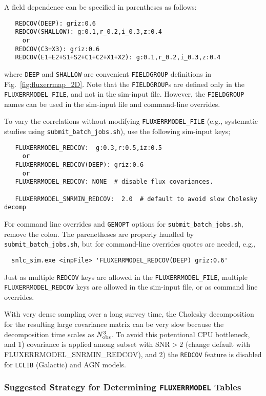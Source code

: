 \documentclass[12pt]{article}
\newcommand{\submit}{\tt submit\_batch\_jobs.sh}
\begin{document}
{A field dependence can be specified in parentheses as follows:
\begin{Verbatim}
   REDCOV(DEEP): griz:0.6
   REDCOV(SHALLOW): g:0.1,r_0.2,i_0.3,z:0.4
     or
   REDCOV(C3+X3): griz:0.6
   REDCOV(E1+E2+S1+S2+C1+C2+X1+X2): g:0.1,r_0.2,i_0.3,z:0.4
\end{Verbatim}
%
where {\tt DEEP} and {\tt SHALLOW} are convenient 
{\tt FIELDGROUP} definitions in Fig.~\ref{fig:fluxerrmap_2D}.
Note that the {\tt FIELDGROUP}s are defined only in the
{\tt FLUXERRMODEL\_FILE}, and not in the sim-input file.
However, the {\tt FIELDGROUP} names can be used in the
sim-input file and command-line overrides.

\medskip
To vary the correlations without modifying {\tt FLUXERRMODEL\_FILE}
(e.g., systematic studies using {\submit}),
use the following sim-input keys;
\begin{Verbatim}
   FLUXERRMODEL_REDCOV:  g:0.3,r:0.5,iz:0.5
     or 
   FLUXERRMODEL_REDCOV(DEEP): griz:0.6
     or 
   FLUXERRMODEL_REDCOV: NONE  # disable flux covariances.
  
   FLUXERRMODEL_SNRMIN_REDCOV:  2.0  # default to avoid slow Cholesky decomp
\end{Verbatim}
For command line overrides and {\tt GENOPT} options for {\submit},
remove the colon. The parenetheses are properly handled by
{\submit}, but for command-line overrides quotes are needed,
e.g., 
\begin{Verbatim}
  snlc_sim.exe <inpFile> 'FLUXERRMODEL_REDCOV(DEEP) griz:0.6'
\end{Verbatim}
%
Just as multiple {\tt REDCOV} keys are allowed in the
{\tt FLUXERRMODEL\_FILE},
multiple {\tt FLUXERRMODEL\_REDCOV} keys are allowed
in the sim-input file, or as command line overrides.

With very dense sampling over a long survey time, 
the Cholesky decomposition for the resulting large covariance matrix 
can be very slow because the decomposition time scales as $N_{\rm obs}^3$.
To avoid this potentional CPU bottleneck, and
1) covariance is applied among subset with SNR$>2$
(change default with {FLUXERRMODEL\_SNRMIN\_REDCOV}), and
2) the {\tt REDCOV} feature is disabled for {\tt LCLIB} (Galactic)
and AGN models.

\clearpage
\subsubsection{ Suggested Strategy for Determining {\tt FLUXERRMODEL} Tables }
\label{sss:fluxerrmap_ideas}

}
\end{document}

